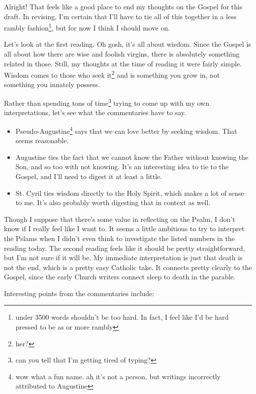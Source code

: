 \documentclass[12pt]{article}[titlepage]
\newcommand{\1}{\={a}}
\newcommand{\2}{\={e}}
\newcommand{\3}{\={\i}}
\newcommand{\4}{\=o}
\newcommand{\5}{\=u}
\newcommand{\6}{\={A}}
\renewcommand{\,}{\textsuperscript{,}}
\begin{document}
Alright! That feels like a good place to end my thoughts on the Gospel for this draft.
In revising, I'm certain that I'll have to tie all of this together in a less rambly fashion\footnote{under 3500 words shouldn't be too hard. In fact, I feel like I'd be hard pressed to be as or more rambly}, but for now I think I should move on.

Let's look at the first reading.
Oh gosh, it's all about wisdom.
Since the Gospel is all about how there are wise and foolish virgins, there is absolutely something related in those.
Still, my thoughts at the time of reading it were fairly simple.
Wisdom comes to those who seek it\footnote{her?} and is something you grow in, not something you innately possess.

Rather than spending tons of time\footnote{can you tell that I'm getting tired of typing?} trying to come up with my own interpretations, let's see what the commentaries have to say.

\begin{itemize}
\item Pseudo-Augustine\footnote{wow what a fun name. ah it's not a person, but writings incorrectly attributed to Augustine} says that we can love better by seeking wisdom.
That seems reasonable.
\item Augustine ties the fact that we cannot know the Father without knowing the Son, and so too with not knowing.
It's an interesting idea to tie to the Gospel, and I'll need to digest it at least a little.
\item St. Cyril ties wisdom directly to the Holy Spirit, which makes a lot of sense to me.
It's also probably worth digesting that in context as well.
\end{itemize}

Though I suppose that there's some value in reflecting on the Psalm, I don't know if I really feel like I want to.
It seems a little ambitious to try to interpret the Pslams when I didn't even think to investigate the listed numbers in the reading today.
The second reading feels like it should be pretty straightforward, but I'm not sure if it will be.
My immediate interpretation is just that death is not the end, which is a pretty easy Catholic take.
It connects pretty clearly to the Gospel, since the early Church writers connect sleep to death in the parable.

Interesting points from the commentaries include:
\end{document}

